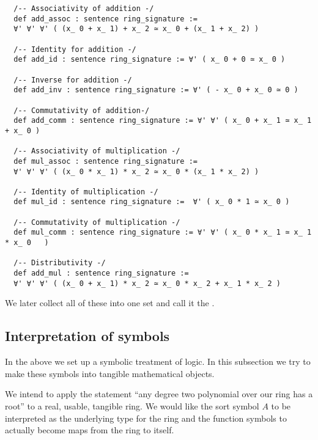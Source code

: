 \begin{lstlisting}
  /-- Associativity of addition -/
  def add_assoc : sentence ring_signature :=
  ∀' ∀' ∀' ( (x_ 0 + x_ 1) + x_ 2 ≃ x_ 0 + (x_ 1 + x_ 2) )

  /-- Identity for addition -/
  def add_id : sentence ring_signature := ∀' ( x_ 0 + 0 ≃ x_ 0 )

  /-- Inverse for addition -/
  def add_inv : sentence ring_signature := ∀' ( - x_ 0 + x_ 0 ≃ 0 )

  /-- Commutativity of addition-/
  def add_comm : sentence ring_signature := ∀' ∀' ( x_ 0 + x_ 1 ≃ x_ 1 + x_ 0 )

  /-- Associativity of multiplication -/
  def mul_assoc : sentence ring_signature :=
  ∀' ∀' ∀' ( (x_ 0 * x_ 1) * x_ 2 ≃ x_ 0 * (x_ 1 * x_ 2) )

  /-- Identity of multiplication -/
  def mul_id : sentence ring_signature :=  ∀' ( x_ 0 * 1 ≃ x_ 0 )

  /-- Commutativity of multiplication -/
  def mul_comm : sentence ring_signature := ∀' ∀' ( x_ 0 * x_ 1 ≃ x_ 1 * x_ 0   )

  /-- Distributivity -/
  def add_mul : sentence ring_signature :=
  ∀' ∀' ∀' ( (x_ 0 + x_ 1) * x_ 2 ≃ x_ 0 * x_ 2 + x_ 1 * x_ 2 )\end{lstlisting}

We later collect all of these into one set and call it the
.

\subsection{Interpretation of symbols}

In the above we set up a symbolic treatment of logic.
In this subsection we try to make these symbols into tangible mathematical objects.

We intend to apply the statement
``any degree two polynomial over our ring has a root''
to a real, usable, tangible ring.
We would like the sort symbol $A$ to be interpreted as the underlying type
for the ring and the function symbols to actually become maps from the ring to itself.

